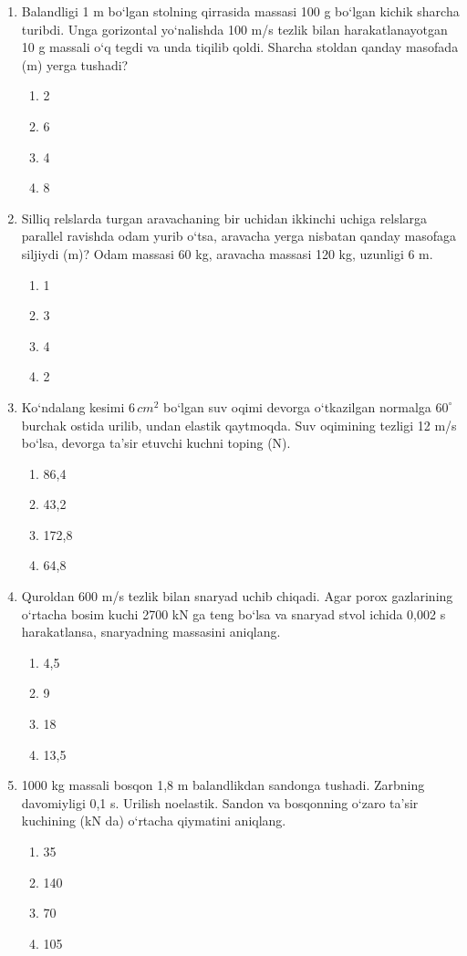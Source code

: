 \begin{enumerate}
	\item Balandligi 1 m bo‘lgan stolning qirrasida massasi 100 g bo‘lgan kichik sharcha turibdi. Unga gorizontal yo‘nalishda 100 m/s tezlik bilan harakatlanayotgan 10 g massali o‘q tegdi va unda tiqilib qoldi. Sharcha stoldan qanday masofada (m) yerga tushadi?
	\begin{enumerate}[label=\Alph*)]
		\item 2
		\item 6
		\item 4
		\item 8
	\end{enumerate}
	
	\item Silliq relslarda turgan aravachaning bir uchidan ikkinchi uchiga relslarga parallel ravishda odam yurib o‘tsa, aravacha yerga nisbatan qanday masofaga siljiydi (m)? Odam massasi 60 kg, aravacha massasi 120 kg, uzunligi 6 m.
	\begin{enumerate}[label=\Alph*)]
		\item 1
		\item 3
		\item 4
		\item 2
	\end{enumerate}
	
	\item Ko‘ndalang kesimi $6 \, cm^2$ bo‘lgan suv oqimi devorga o‘tkazilgan normalga $60^\circ$ burchak ostida urilib, undan elastik qaytmoqda. Suv oqimining tezligi 12 m/s bo‘lsa, devorga ta’sir etuvchi kuchni toping (N).
	\begin{enumerate}[label=\Alph*)]
		\item 86,4
		\item 43,2
		\item 172,8
		\item 64,8
	\end{enumerate}
	
	\item Quroldan 600 m/s tezlik bilan snaryad uchib chiqadi. Agar porox gazlarining o‘rtacha bosim kuchi 2700 kN ga teng bo‘lsa va snaryad stvol ichida 0,002 s harakatlansa, snaryadning massasini aniqlang.
	\begin{enumerate}[label=\Alph*)]
		\item 4,5
		\item 9
		\item 18
		\item 13,5
	\end{enumerate}
	
	\item 1000 kg massali bosqon 1,8 m balandlikdan sandonga tushadi. Zarbning davomiyligi 0,1 s. Urilish noelastik. Sandon va bosqonning o‘zaro ta’sir kuchining (kN da) o‘rtacha qiymatini aniqlang.
	\begin{enumerate}[label=\Alph*)]
		\item 35
		\item 140
		\item 70
		\item 105
	\end{enumerate}
	

\end{enumerate}
